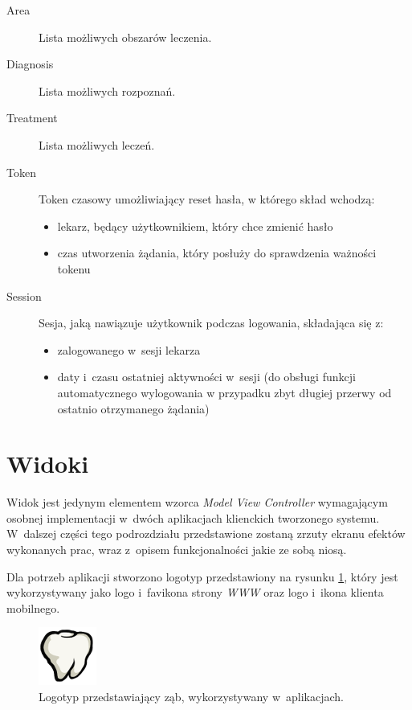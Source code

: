 \documentclass[11pt]{aghdpl}
\begin{document}
\begin{description}
\item[Area]
	Lista możliwych obszarów leczenia.
\item[Diagnosis]
	Lista możliwych rozpoznań.
\item[Treatment]
	Lista możliwych leczeń.
\item[Token]
	Token czasowy umożliwiający reset hasła, w którego skład wchodzą:
	\begin{itemize}
		\item lekarz, będący użytkownikiem, który chce zmienić hasło
		\item czas utworzenia żądania, który posłuży do sprawdzenia ważności tokenu
	\end{itemize}
\item[Session]
	Sesja, jaką nawiązuje użytkownik podczas logowania, składająca się z:
	\begin{itemize}
		\item zalogowanego w~sesji lekarza
		\item daty i~czasu ostatniej aktywności w~sesji (do obsługi funkcji automatycznego wylogowania w przypadku zbyt długiej przerwy od ostatnio otrzymanego żądania)
	\end{itemize}
\end{description}

\section{Widoki}

Widok jest jedynym elementem wzorca \emph{Model View Controller} wymagającym osobnej implementacji w~dwóch aplikacjach klienckich tworzonego systemu. W~dalszej części tego podrozdziału przedstawione zostaną zrzuty ekranu efektów wykonanych prac, wraz z~opisem funkcjonalności jakie ze sobą niosą.

Dla potrzeb aplikacji stworzono logotyp przedstawiony na rysunku \ref{fig:logo}, który jest wykorzystywany jako logo i~favikona strony \emph{WWW} oraz logo i~ikona klienta mobilnego.

\begin{figure}[h!]
	\centering
	\includegraphics{logo}
	\caption{Logotyp przedstawiający ząb, wykorzystywany w~aplikacjach.}
	\label{fig:logo}
\end{figure}
\end{document}
